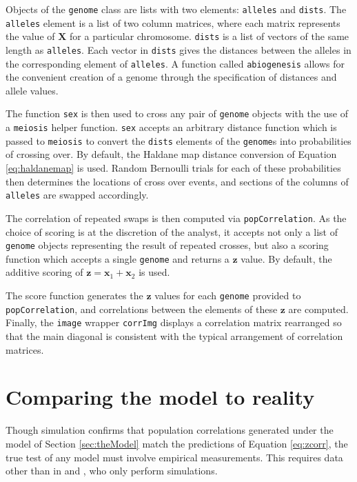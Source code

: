 \documentclass[12pt]{article}
\newcommand{\code}[1]{\texttt{#1}}
\newcommand{\ve}[1]{\mathbf{#1}}           %
\newcommand{\m}[1]{\mathbf{#1}}               %
\begin{document}
Objects of the \code{genome} class are lists with two elements: \code{alleles} and \code{dists}. The \code{alleles} element is a list of two column matrices, where each matrix represents the value of $\m{X}$ for a particular chromosome. \code{dists} is a list of vectors of the same length as \code{alleles}. Each vector in \code{dists} gives the distances between the alleles in the corresponding element of \code{alleles}. A function called \code{abiogenesis} allows for the convenient creation of a genome through the specification of distances and allele values.

The function \code{sex} is then used to cross any pair of \code{genome} objects with the use of a \code{meiosis} helper function. \code{sex} accepts an arbitrary distance function which is passed to \code{meiosis} to convert the \code{dists} elements of the \code{genome}s into probabilities of crossing over. By default, the Haldane map distance conversion of Equation \ref{eq:haldanemap} is used. Random Bernoulli trials for each of these probabilities then determines the locations of cross over events, and sections of the columns of \code{alleles} are swapped accordingly.

The correlation of repeated swaps is then computed via \code{popCorrelation}. As the choice of scoring is at the discretion of the analyst, it accepts not only a list of \code{genome} objects representing the result of repeated crosses, but also a scoring function which accepts a single \code{genome} and returns a $\ve{z}$ value. By default, the additive scoring of $\ve{z} = \ve{x}_1 + \ve{x}_2$ is used.

The score function generates the $\ve{z}$ values for each \code{genome} provided to \code{popCorrelation}, and correlations between the elements of these $\ve{z}$ are computed. Finally, the \code{image} wrapper \code{corrImg} displays a correlation matrix rearranged so that the main diagonal is consistent with the typical arrangement of correlation matrices. 

\section{Comparing the model to reality} \label{sec:model2real}

Though simulation confirms that population correlations generated under the model of Section \ref{sec:theModel} match the predictions of Equation \ref{eq:zcorr}, the true test of any model must involve empirical measurements. This requires data other than in \cite{LanderBotstein1989} and \cite{cheverud2001}, who only perform simulations.
\end{document}
